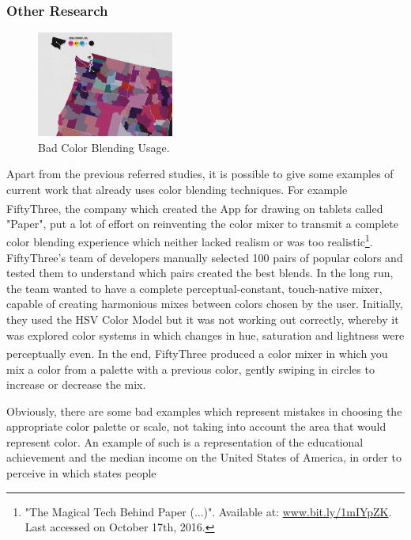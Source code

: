 \subsubsection{Other Research}
\label{subsubsec:other_research}
%
\begin{figure}
	\centering
    \vspace{-10pt}
    \includegraphics[width=0.4\textwidth]{images/background/CMYKbad.png}
    \caption[Color Blending: CMYK Bad Example]{Bad Color Blending Usage.\protect\footnotemark[25]}
    \label{fig:cmykbad}
\end{figure}
%
Apart from the previous referred studies, it is possible to give some
examples of current work that already uses color blending techniques. For example FiftyThree\textsuperscript{\textregistered},
the company which created the App for drawing on tablets called "Paper", put a lot of effort on reinventing the color mixer to
transmit a complete color blending experience which neither lacked realism or was too realistic\footnote{"The Magical Tech
Behind Paper (...)". Available at: \url{www.bit.ly/1mIYpZK}. Last accessed on October 17th, 2016.}. FiftyThree's team
of developers manually selected 100 pairs of popular colors and tested them to understand which pairs created the
best blends. In the long run, the team wanted to have a complete perceptual-constant, touch-native mixer, capable of
creating harmonious mixes between colors chosen by the user. Initially, they used the HSV Color Model but it was not
working out correctly, whereby it was explored color systems in which changes in hue, saturation and lightness were
perceptually even. In the end, FiftyThree\textsuperscript{\textregistered} produced a color mixer in which you mix
a color from a palette with a previous color, gently swiping in circles to increase or decrease the mix.\par
%
Obviously, there are some bad examples which represent mistakes in choosing the appropriate color palette or scale,
not taking into account the area that would represent color. An example of such is a representation of the
educational achievement and the median income on the United States of America, in order to perceive in which states people

